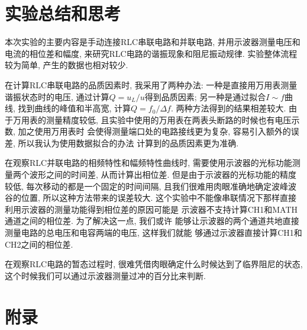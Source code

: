 \documentclass[zihao=5, UTF8]{article}
\theoremstyle{MyLineTheoremStyle} %
\theoremstyle{MyBlockTheoremStyle} %
\theoremstyle{MySubsubsectionStyle} %
\begin{document}
\section{实验总结和思考}

本次实验的主要内容是手动连接RLC串联电路和并联电路, 
并用示波器测量电压和电流的相位差和幅度, 来研究RLC电路的谐振现象和阻尼振动规律.
实验整体流程较为简单, 产生的数据也相对较少.

在计算RLC串联电路的品质因素时, 我采用了两种办法: 一种是直接用万用表测量谐振状态时的电压,
通过计算$Q = u_L/u$得到品质因素; 另一种是通过拟合$I \sim f$曲线, 找到曲线的峰值和半高宽,
计算$Q = f_0/\Delta f$. 两种方法得到的结果相差较大. 由于万用表的测量精度较低, 
且实验中使用的万用表在两表头断路的时候也有电压示数, 加之使用万用表时
会使得测量端口处的电路接线更为复杂, 容易引入额外的误差, 所以我认为使用数据拟合的办法
计算到的品质因素更为准确.

在观察RLC并联电路的相频特性和幅频特性曲线时, 需要使用示波器的光标功能测量两个波形之间的时间差,
从而计算出相位差. 但是由于示波器的光标功能的精度较低, 每次移动的都是一个固定的时间间隔,
且我们很难用肉眼准确地确定波峰波谷的位置, 所以这种方法带来的误差较大. 
这个实验中不能像串联情况下那样直接利用示波器的测量功能得到相位差的原因可能是
示波器不支持计算CH1和MATH通道之间的相位差. 为了解决这一点, 我们或许
能够让示波器的两个通道共地直接测量电路的总电压和电容两端的电压, 这样我们就能
够通过示波器直接计算CH1和CH2之间的相位差.

在观察RLC电路的暂态过程时, 很难凭借肉眼确定什么时候达到了临界阻尼的状态, 
这个时候我们可以通过示波器测量过冲的百分比来判断.

\section{附录}



\end{document}
